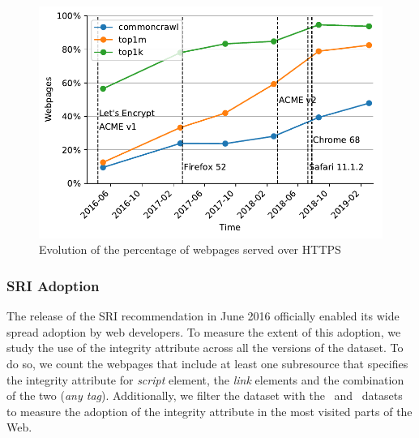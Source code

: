 \documentclass[sigconf,table]{acmart}
\begin{document}

\begin{figure}[h]
	\includegraphics[width=\columnwidth]{../../notebooks/01_pages_per_protocol}
	\caption{Evolution of the percentage of webpages served over HTTPS}
	\label{fig:01}
\end{figure}


\subsubsection{SRI Adoption}

The release of the SRI recommendation in June 2016 officially enabled its wide spread adoption by web developers.
To measure the extent of this adoption, we study the use of the integrity attribute across all the versions of the \CCSRI dataset.
To do so, we count the webpages that include at least one subresource that specifies the integrity attribute for \textit{script} element, the \textit{link} elements and the combination of the two (\textit{any tag}).
Additionally, we filter the \CC dataset with the \TopK\ and \TopM\ datasets to measure the adoption of the integrity attribute in the most visited parts of the Web.
\end{document}
